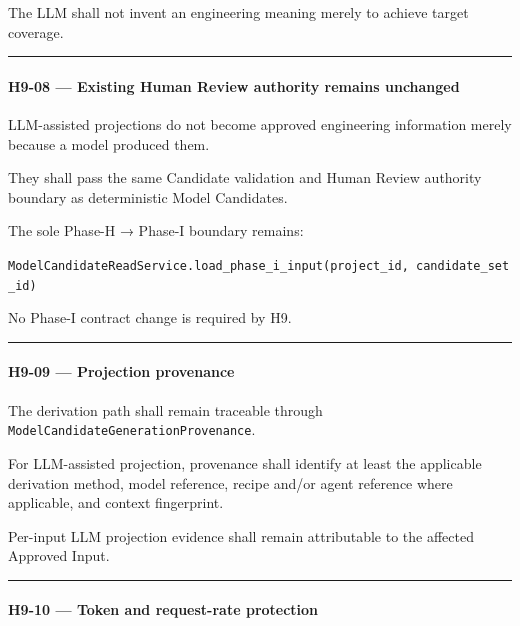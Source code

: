 The LLM shall not invent an engineering meaning merely to achieve target coverage.

\begin{center}\rule{0.5\linewidth}{0.5pt}\end{center}

\hypertarget{h9-08--existing-human-review-authority-remains-unchanged}{%
\paragraph{H9-08 --- Existing Human Review authority remains unchanged}\label{h9-08--existing-human-review-authority-remains-unchanged}}

LLM-assisted projections do not become approved engineering information merely because a model produced them.

They shall pass the same Candidate validation and Human Review authority boundary as deterministic Model Candidates.

The sole Phase-H → Phase-I boundary remains:

\texttt{ModelCandidateReadService.load\_phase\_i\_input(project\_id,\ candidate\_set\_id)}

No Phase-I contract change is required by H9.

\begin{center}\rule{0.5\linewidth}{0.5pt}\end{center}

\hypertarget{h9-09--projection-provenance}{%
\paragraph{H9-09 --- Projection provenance}\label{h9-09--projection-provenance}}

The derivation path shall remain traceable through \texttt{ModelCandidateGenerationProvenance}.

For LLM-assisted projection, provenance shall identify at least the applicable derivation method, model reference, recipe and/or agent reference where applicable, and context fingerprint.

Per-input LLM projection evidence shall remain attributable to the affected Approved Input.

\begin{center}\rule{0.5\linewidth}{0.5pt}\end{center}

\hypertarget{h9-10--token-and-request-rate-protection}{%
\paragraph{H9-10 --- Token and request-rate protection}\label{h9-10--token-and-request-rate-protection}}

